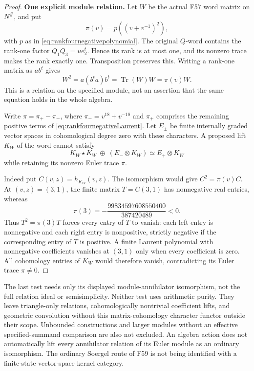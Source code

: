 \documentclass[11pt,a4paper]{article}
\newcommand{\fid}[1]{\textsf{#1}}\newcommand{\gate}[1]{\textsf{#1}}
\theoremstyle{named}\newtheorem{finding}{Finding}[section]
\theoremstyle{definition}\newtheorem{definition}[finding]{Definition}
\theoremstyle{remark}\newtheorem{remark}[finding]{Remark}
\begin{document}
\begin{proof}
\par\smallskip\noindent\textbf{One explicit module relation.}\quad
Let \(W\) be the actual \fid{F57} word matrix on \(N^\#\),
and put
\[
\pi(v)=p((v+v^{-1})^2),
\]
with \(p\) as in \eqref{eq:rankfournegativepolynomial}.
The original \(Q\)-word contains the rank-one factor
\(Q_1Q_3=ue_2^t\). Hence its rank is at most one,
and its nonzero trace makes the rank exactly one.
Transposition preserves this.
Writing a rank-one matrix as \(ab^t\) gives
\[
W^2=a(b^ta)b^t=\operatorname{Tr}(W)W=\pi(v)W.
\]
This is a relation on the specified module, not an assertion
that the same equation holds in the whole algebra.

Write \(\pi=\pi_+-\pi_-\), where
\(\pi_-=v^{18}+v^{-18}\) and \(\pi_+\) comprises the
remaining positive terms of
\eqref{eq:rankfournegativeLaurent}.
Let \(E_\pm\) be finite internally graded vector spaces
in cohomological degree zero with these characters.
A proposed lift \(K_W\) of the word cannot satisfy
\begin{equation}\label{eq:rankonewordisomorphismgate}
K_W\star K_W\ \oplus\ (E_-\otimes K_W)
\simeq E_+\otimes K_W
\end{equation}
while retaining its nonzero Euler trace \(\pi\).

Indeed put \(C(v,z)=h_{K_W}(v,z)\).
The isomorphism would give \(C^2=\pi(v)C\).
At \((v,z)=(3,1)\), the finite matrix \(T=C(3,1)\)
has nonnegative real entries, whereas
\[
\pi(3)=-\frac{99834597608550400}{387420489}<0.
\]
Thus \(T^2=\pi(3)T\) forces every entry of \(T\) to
vanish: each left entry is nonnegative and each right
entry is nonpositive, strictly negative if the corresponding
entry of \(T\) is positive.
A finite Laurent polynomial with nonnegative coefficients
vanishes at \((3,1)\) only when every coefficient is zero.
All cohomology entries of \(K_W\) would therefore vanish,
contradicting its Euler trace \(\pi\ne0\).
\end{proof}

The last test needs only its displayed module-annihilator
isomorphism, not the full relation ideal or semisimplicity.
Neither test uses arithmetic purity.
They leave triangle-only relations, cohomologically nontrivial
coefficient lifts, and geometric convolution without this
matrix-cohomology character functor outside their scope.
Unbounded constructions and larger modules without an effective
specified-summand comparison are also not excluded.
An algebra action does not automatically lift every annihilator
relation of its Euler module as an ordinary isomorphism.
The ordinary Soergel route of \fid{F59} is not being identified
with a finite-state vector-space kernel category.
\end{document}
